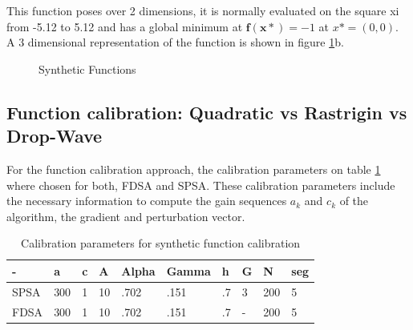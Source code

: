 This function poses over 2 dimensions, it is normally evaluated on the square xi from -5.12 to 5.12 and has a global minimum at \(\boldsymbol{f(x*)} = -1\) at \(x* = (0, 0)\). A 3 dimensional representation of the function is shown in figure \ref{eq5-fig}b.

\begin{figure}[htpb]
  \centering
    \qquad
  \caption{Synthetic Functions}
  \label{eq5-fig}
\end{figure}

\subsection{Function calibration: Quadratic vs Rastrigin vs Drop-Wave}
For the function calibration approach, the calibration parameters on table \ref{tab:calibration-params} where chosen for both, FDSA and SPSA. These calibration parameters include the necessary information to compute the gain sequences \(a_k\) and \(c_k\) of the algorithm, the gradient and perturbation vector. 
\vskip 0.2in
\vskip 0.2in
\vskip 0.2in
\vskip 0.2in
\vskip 0.2in
\vskip 0.2in

\begin{table}[htpb]
  \centering
  \begin{tabular}{l l l l l l l l l l}
    \toprule
      - & a & c & A & Alpha & Gamma & h & G & N & seg\\
    \midrule
      SPSA & 300 & 1 & 10 & .702 & .151 & .7 & 3 & 200 & 5 \\
      FDSA & 300 & 1 & 10 & .702 & .151 & .7 & - & 200 & 5 \\
    \bottomrule
  \end{tabular}
  \caption[Calibration Parameters]{Calibration parameters for synthetic function calibration}
  \label{tab:calibration-params}
\end{table}

